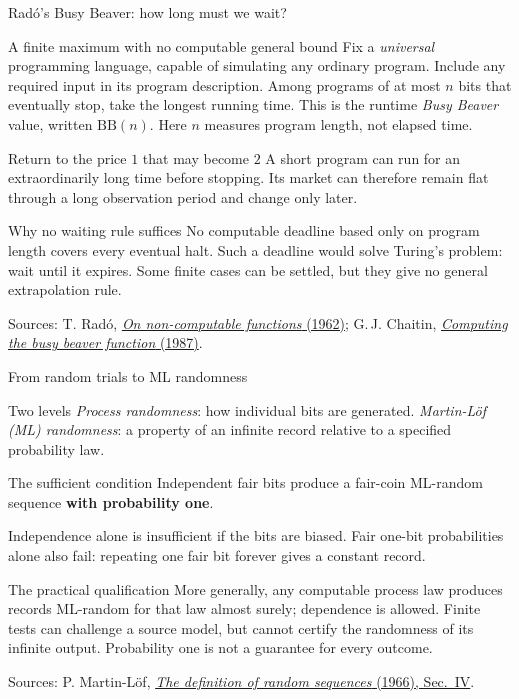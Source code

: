 \documentclass{beamer}
\newcommand{\doiref}[2]{%
  \href{https://doi.org/#1}{\textcolor{blue!65!black}{#2}}}
\newcommand{\sourcefoot}[1]{%
  \par\vfill{\fontsize{6.3}{7.5}\selectfont\color{black!65}Sources: #1\par}}
\begin{document}
\begin{frame}{Rad\'o's Busy Beaver: how long must we wait?}
\small
\begin{block}{A finite maximum with no computable general bound}
Fix a \emph{universal} programming language, capable of simulating any
ordinary program. Include any required input in its program description.
Among programs of at most $n$ bits that eventually stop, take the longest
running time. This is the runtime
\emph{Busy Beaver} value, written $\mathrm{BB}(n)$.
Here $n$ measures program length, not elapsed time.
\end{block}
\begin{exampleblock}{Return to the price $1$ that may become $2$}
A short program can run for an extraordinarily long time before stopping.
Its market can therefore remain flat through a long observation period and
change only later.
\end{exampleblock}
\begin{alertblock}{Why no waiting rule suffices}
No computable deadline based only on program length covers every eventual
halt. Such a deadline would solve Turing's problem: wait until it expires.
Some finite cases can be settled, but they give no general extrapolation rule.
\end{alertblock}
\sourcefoot{T. Rad\'o,
\doiref{10.1002/j.1538-7305.1962.tb00480.x}{\emph{On non-computable functions} (1962)};
G.\,J. Chaitin,
\doiref{10.1007/978-1-4612-4808-8_28}{\emph{Computing the busy beaver function} (1987)}.}
\end{frame}

\begin{frame}{From random trials to ML randomness}
\small
\begin{block}{Two levels}
\emph{Process randomness}: how individual bits are generated.
\emph{Martin-L\"of (ML) randomness}: a property of an infinite record
relative to a specified probability law.
\end{block}
\begin{alertblock}{The sufficient condition}
Independent fair bits produce a fair-coin ML-random sequence
\textbf{with probability one}.
\par\smallskip
Independence alone is insufficient if the bits are biased.
Fair one-bit probabilities alone also fail: repeating one fair bit forever
gives a constant record.
\end{alertblock}
\begin{exampleblock}{The practical qualification}
More generally, any computable process law produces records ML-random
for that law almost surely; dependence is allowed.
Finite tests can challenge a source model, but cannot certify the randomness
of its infinite output. Probability one is not a guarantee for every outcome.
\end{exampleblock}
\sourcefoot{P. Martin-L\"of,
\doiref{10.1016/S0019-9958(66)80018-9}{\emph{The definition of random sequences} (1966), Sec.~IV}.}
\end{frame}
\end{document}
